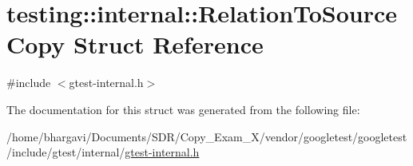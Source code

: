 \hypertarget{structtesting_1_1internal_1_1_relation_to_source_copy}{}\section{testing\+:\+:internal\+:\+:Relation\+To\+Source\+Copy Struct Reference}
\label{structtesting_1_1internal_1_1_relation_to_source_copy}


{\ttfamily \#include $<$gtest-\/internal.\+h$>$}



The documentation for this struct was generated from the following file\+:\begin{DoxyCompactItemize}
\item 
/home/bhargavi/\+Documents/\+S\+D\+R/\+Copy\+\_\+\+Exam\+\_\+X/vendor/googletest/googletest/include/gtest/internal/\hyperlink{gtest-internal_8h}{gtest-\/internal.\+h}\end{DoxyCompactItemize}
